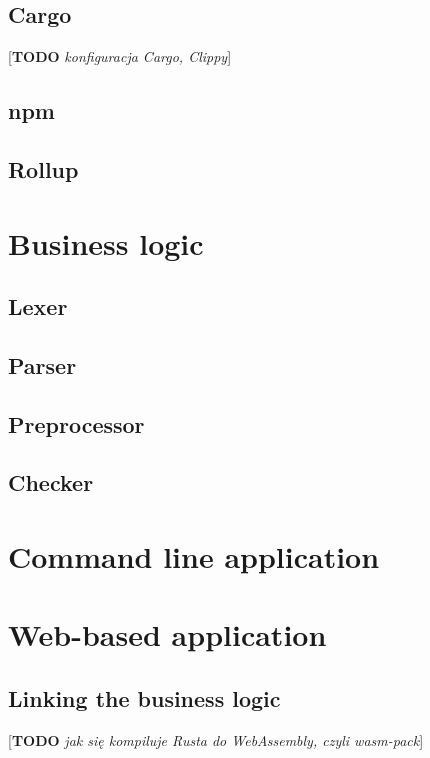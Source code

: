 \documentclass[english,engineering]{wizthesis}
\newcommand{\todo}[1]{{\color{red}[\textbf{TODO} \textit{#1}]}}
\begin{document}
\subsection{Cargo}

\todo{konfiguracja Cargo, Clippy}

\subsection{npm}

\subsection{Rollup}

\section{Business logic}

\subsection{Lexer}

\subsection{Parser}

\subsection{Preprocessor}

\subsection{Checker}

\section{Command line application}

\section{Web-based application}

\subsection{Linking the business logic}

\todo{jak się kompiluje Rusta do WebAssembly, czyli wasm-pack}
\end{document}
